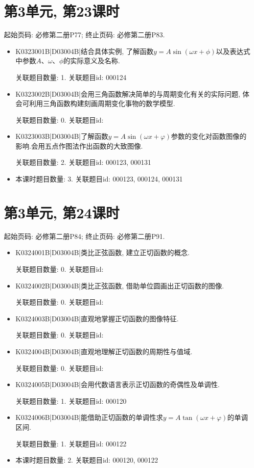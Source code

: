 \section*{第3单元, 第23课时}
起始页码: 必修第二册P77; 终止页码: 必修第二册P83.
\begin{itemize}
\item K0323001B|D03004B|结合具体实例, 了解函数$y=A\sin(\omega x+\phi)$以及表达式中参数$A$、$\omega$、$\phi$的实际意义及名称.

关联题目数量: 1. 关联题目id: 000124

\item K0323002B|D03004B|会用三角函数解决简单的与周期变化有关的实际问题, 体会可利用三角函数构建刻画周期变化事物的数学模型.

关联题目数量: 0. 关联题目id: 

\item K0323003B|D03004B|了解函数$y=A\sin(\omega x+\varphi)$参数的变化对函数图像的影响.会用五点作图法作出函数的大致图像.

关联题目数量: 2. 关联题目id: 000123, 000131

\item 本课时题目数量: 3. 关联题目id: 000123, 000124, 000131

\end{itemize}

\section*{第3单元, 第24课时}
起始页码: 必修第二册P84; 终止页码: 必修第二册P91.
\begin{itemize}
\item K0324001B|D03004B|类比正弦函数, 建立正切函数的概念.

关联题目数量: 0. 关联题目id: 

\item K0324002B|D03004B|类比正弦函数, 借助单位圆画出正切函数的图像.

关联题目数量: 0. 关联题目id: 

\item K0324003B|D03004B|直观地掌握正切函数的图像特征.

关联题目数量: 0. 关联题目id: 

\item K0324004B|D03004B|直观地理解正切函数的周期性与值域.

关联题目数量: 0. 关联题目id: 

\item K0324005B|D03004B|会用代数语言表示正切函数的奇偶性及单调性.

关联题目数量: 1. 关联题目id: 000120

\item K0324006B|D03004B|能借助正切函数的单调性求$y=A\tan(\omega x+\varphi)$的单调区间.

关联题目数量: 1. 关联题目id: 000122

\item 本课时题目数量: 2. 关联题目id: 000120, 000122

\end{itemize}

